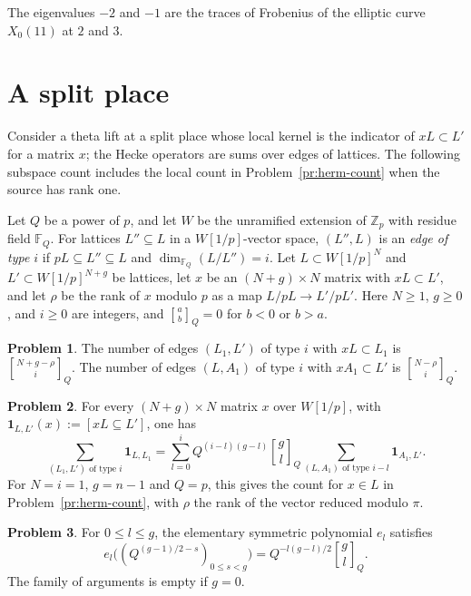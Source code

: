 \documentclass[reqno]{amsart}
\theoremstyle{definition}
\newtheorem{problem}{Problem}[section]
\theoremstyle{plain}
\newcommand{\Z}{\mathbb{Z}}
\newcommand{\F}{\mathbb{F}}
\newcommand{\qbinom}[3]{\genfrac{[}{]}{0pt}{}{#1}{#2}_{#3}}
\begin{document}
The eigenvalues \(-2\) and \(-1\) are the traces of Frobenius of the elliptic curve \(X_0(11)\) at \(2\) and \(3\).


\section{A split place}\label{sec:split}

Consider a theta lift at a split place whose local kernel is the indicator of \(xL \subset L'\) for a matrix \(x\); the Hecke operators are sums over edges of lattices.  The following subspace count includes the local count in Problem~\ref{pr:herm-count} when the source has rank one.

Let \(Q\) be a power of \(p\), and let \(W\) be the unramified extension of \(\Z_p\) with residue field \(\F_Q\).  For lattices \(L'' \subseteq L\) in a \(W[1/p]\)-vector space, \((L'', L)\) is an \emph{edge of type \(i\)} if \(pL\subseteq L''\subseteq L\) and \(\dim_{\F_Q}(L/L'')=i\).  Let \(L \subset W[1/p]^N\) and \(L' \subset W[1/p]^{N+g}\) be lattices, let \(x\) be an \((N+g) \times N\) matrix with \(xL \subset L'\), and let \(\rho\) be the rank of \(x\) modulo \(p\) as a map \(L/pL \to L'/pL'\).  Here \(N\ge1\), \(g\ge0\), and \(i\ge0\) are integers, and \(\qbinom{a}{b}{Q}=0\) for \(b<0\) or \(b>a\).

\begin{problem}\label{pr:split-count}
The number of edges \((L_1, L')\) of type \(i\) with \(xL \subset L_1\) is \(\qbinom{N+g-\rho}{i}{Q}\).  The number of edges \((L, A_1)\) of type \(i\) with \(xA_1 \subset L'\) is \(\qbinom{N-\rho}{i}{Q}\).
\end{problem}

\begin{problem}\label{pr:split-vandermonde}
For every \((N+g)\times N\) matrix \(x\) over \(W[1/p]\), with \(\mathbf 1_{L,L'}(x):=[xL\subseteq L']\), one has
\[
  \sum_{(L_1, L') \text{ of type } i} \mathbf 1_{L, L_1}
  = \sum_{l=0}^{i} Q^{(i-l)(g-l)} \qbinom{g}{l}{Q} \sum_{(L, A_1) \text{ of type } i-l} \mathbf 1_{A_1, L'} .
\]
For \(N=i=1\), \(g=n-1\) and \(Q=p\), this gives the count for \(x\in L\) in Problem~\ref{pr:herm-count}, with \(\rho\) the rank of the vector reduced modulo \(\pi\).
\end{problem}

\begin{problem}\label{pr:split-el}
For \(0\le l\le g\), the elementary symmetric polynomial \(e_l\) satisfies
\[
  e_l\bigl((Q^{(g-1)/2-s})_{0\le s<g}\bigr)
  = Q^{-l(g-l)/2}\qbinom{g}{l}{Q} .
\]
The family of arguments is empty if \(g=0\).
\end{problem}
\end{document}
